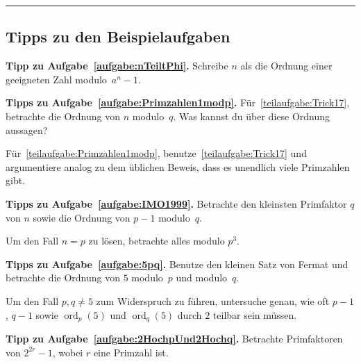 \vfill\hrule\vspace{-1em}
\subsection*{Tipps zu den Beispielaufgaben}

\textbf{Tipp zu Aufgabe~\ref{aufgabe:nTeiltPhi}.} Schreibe $n$ als die Ordnung einer geeigneten Zahl modulo~$a^n-1$.

\textbf{Tipps zu Aufgabe~\ref{aufgabe:Primzahlen1modp}.} Für~\ref{teilaufgabe:Trick17}, betrachte die Ordnung von $n$ modulo~$q$. Was kannst du über diese Ordnung aussagen?

Für~\ref{teilaufgabe:Primzahlen1modp}, benutze~\ref{teilaufgabe:Trick17} und argumentiere analog zu dem üblichen Beweis, dass es unendlich viele Primzahlen gibt.

\textbf{Tipps zu Aufgabe~\ref{aufgabe:IMO1999}.} Betrachte den kleinsten Primfaktor $q$ von $n$ sowie die Ordnung von $p-1$ modulo~$q$.

Um den Fall $n=p$ zu lösen, betrachte alles modulo $p^3$.

\textbf{Tipps zu Aufgabe~\ref{aufgabe:5pq}.} Benutze den kleinen Satz von Fermat und betrachte die Ordnung von $5$ modulo~$p$ und modulo~$q$.

Um den Fall $p,q\neq 5$ zum Widerspruch zu führen, untersuche genau, wie oft $p-1$, $q-1$ sowie $\operatorname{ord}_p(5)$ und $\operatorname{ord}_q(5)$ durch $2$ teilbar sein müssen.


\textbf{Tipp zu Aufgabe~\ref{aufgabe:2HochpUnd2Hochq}.} Betrachte Primfaktoren von $2^{2r}-1$, wobei $r$ eine Primzahl ist.